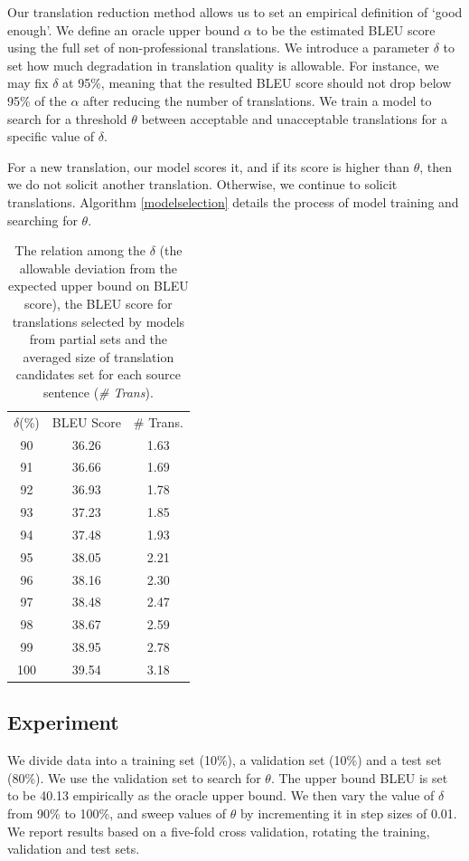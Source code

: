 \documentclass[11pt,letterpaper]{article}
\begin{document}
Our translation reduction method allows us to set an empirical definition of `good enough'.  
We define an oracle upper bound $\alpha$ to be the estimated BLEU score using the full set of non-professional translations.
We introduce a parameter $\delta$ to set how much degradation in translation quality is allowable.  For instance, we may fix $\delta$ at 95\%, meaning that the resulted BLEU score should not drop below 95\% of the $\alpha$ after reducing the number of translations.   We train a model to search for a threshold $\theta$ between acceptable and unacceptable translations for a specific value of $\delta$. 

For a new translation, our model scores it, and if its score is higher than $\theta$, then we do not solicit another translation. Otherwise, we continue to solicit translations.  Algorithm \ref{modelselection} details the process of model training and searching for $\theta$. 


 \begin{table}
 \center
\begin{tabular}{c|c|c}
\hline
$\delta$(\%) & BLEU Score & \# Trans. \\ \hhline{===}
90    & 36.26      & 1.63            \\
91    & 36.66      & 1.69             \\
92    & 36.93      & 1.78             \\
93    & 37.23      & 1.85             \\
94    & 37.48      & 1.93             \\
95    & 38.05      & 2.21             \\
96    & 38.16      & 2.30             \\
97    & 38.48      & 2.47             \\
98    & 38.67      & 2.59             \\
99    & 38.95      & 2.78             \\
100   & 39.54      & 3.18             \\ \hline
\end{tabular}
\caption{The relation among the $\delta$ (the allowable deviation from the expected upper bound on BLEU score), the BLEU score for translations selected by models from partial sets and the averaged size of translation candidates set for each source sentence (\textit{\# Trans}).  }
    \label{orderanother}
\end{table}


\subsection{Experiment}
 We divide data into a training set (10\%), a validation set (10\%) and a test set (80\%). 
We use the validation set to search for $\theta$. The upper bound BLEU is set to be 40.13 empirically as the oracle upper bound. 
We then vary the value of $\delta$ from 90\% to 100\%, and sweep values of $\theta$ by incrementing it in step sizes of 0.01.
We report results based on a five-fold cross validation, rotating the training, validation and test sets.
\end{document}
